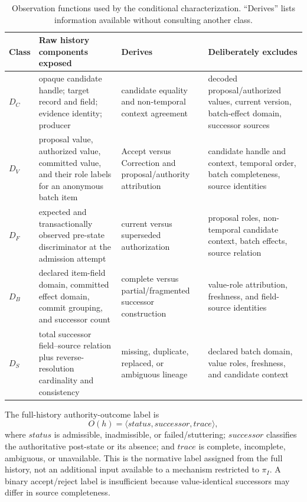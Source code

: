 \begin{table}[t]
\centering
\footnotesize
\caption{Observation functions used by the conditional characterization. ``Derives'' lists information available without consulting another class.}
\label{tab:observation-functions}
\begin{tabularx}{\textwidth}{@{}l>{\raggedright\arraybackslash}p{}>{\raggedright\arraybackslash}p{}>{\raggedright\arraybackslash}X@{}}
\toprule
Class & Raw history components exposed & Derives & Deliberately excludes \\
\midrule
$D_C$ & opaque candidate handle; target record and field; evidence identity; producer & candidate equality and non-temporal context agreement & decoded proposal/authorized values, current version, batch-effect domain, successor sources \\
$D_V$ & proposal value, authorized value, committed value, and their role labels for an anonymous batch item & Accept versus Correction and proposal/authority attribution & candidate handle and context, temporal order, batch completeness, source identities \\
$D_F$ & expected and transactionally observed pre-state discriminator at the admission attempt & current versus superseded authorization & proposal roles, non-temporal candidate context, batch effects, source relation \\
$D_B$ & declared item-field domain, committed effect domain, commit grouping, and successor count & complete versus partial/fragmented successor construction & value-role attribution, freshness, and field-source identities \\
$D_S$ & total successor field--source relation plus reverse-resolution cardinality and consistency & missing, duplicate, replaced, or ambiguous lineage & declared batch domain, value roles, freshness, and candidate context \\
\bottomrule
\end{tabularx}
\end{table}

The full-history authority-outcome label is
\begin{equation}
O(h)=\langle status,successor,trace\rangle,
\label{eq:outcome}
\end{equation}
where $status$ is admissible, inadmissible, or failed/stuttering; $successor$ classifies the authoritative post-state or its absence; and $trace$ is complete, incomplete, ambiguous, or unavailable. This is the normative label assigned from the full history, not an additional input available to a mechanism restricted to $\pi_I$. A binary accept/reject label is insufficient because value-identical successors may differ in source completeness.

